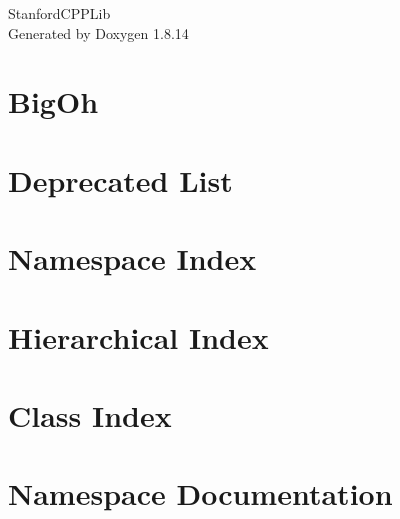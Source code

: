 \documentclass[twoside]{book}
\newcommand{\+}{\discretionary{\mbox{\scriptsize$\hookleftarrow$}}{}{}}
\newcommand{\clearemptydoublepage}{%
  \newpage{\pagestyle{empty}\cleardoublepage}%
}
\begin{document}
\hypersetup{pageanchor=false,
             bookmarksnumbered=true,
             pdfencoding=unicode
            }
\begin{titlepage}
\vspace*{7cm}
\begin{center}%
{\Large Stanford\+C\+P\+P\+Lib }\\
\vspace*{1cm}
{\large Generated by Doxygen 1.8.14}\\
\end{center}
\end{titlepage}
\clearemptydoublepage
{}
\tableofcontents
\clearemptydoublepage
{}
\hypersetup{pageanchor=true}

\chapter{Big\+Oh}
\label{BigOh}

\chapter{Deprecated List}
\label{deprecated}

\chapter{Namespace Index}

\chapter{Hierarchical Index}

\chapter{Class Index}

\chapter{Namespace Documentation}



















\end{document}
